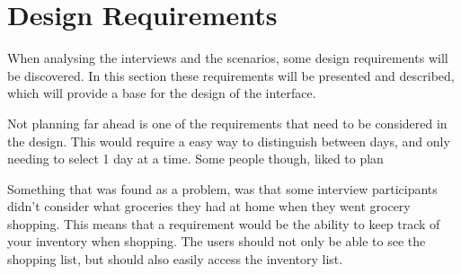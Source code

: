 \section{Design Requirements}

When analysing the interviews and the scenarios, some design requirements will be discovered. In this section these requirements will be presented and described, which will provide a base for the design of the interface.

Not planning far ahead is one of the requirements that need to be considered in the design. This would require a easy way to distinguish between days, and only needing to select 1 day at a time.
Some people though, liked to plan

Something that was found as a problem, was that some interview participants didn't consider what groceries they had at home when they went grocery shopping. This means that a requirement would be the ability to keep track of your inventory when shopping. The users should not only be able to see the shopping list, but should also easily access the inventory list.

 